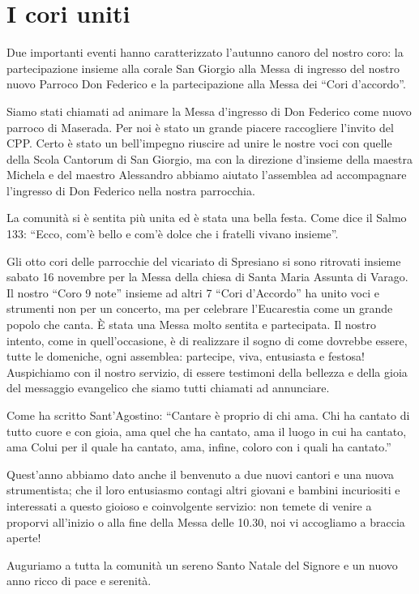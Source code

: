 \section{I cori uniti}

Due importanti eventi hanno caratterizzato l'autunno canoro del nostro coro: la partecipazione insieme alla corale San Giorgio alla Messa di ingresso del nostro nuovo Parroco Don Federico e la partecipazione alla Messa dei ``Cori d'accordo''.

Siamo stati chiamati ad animare la Messa d'ingresso di Don Federico come nuovo parroco di Maserada. Per noi è stato un grande piacere raccogliere l'invito del CPP. Certo è stato un bell'impegno riuscire ad unire le nostre voci con quelle della Scola Cantorum di San Giorgio, ma con la direzione d'insieme della maestra Michela e del maestro Alessandro abbiamo aiutato l'assemblea ad accompagnare l'ingresso di Don Federico nella nostra parrocchia.

La comunità si è sentita più unita ed è stata una bella festa. Come dice il Salmo 133: ``Ecco, com'è bello e com'è dolce che i fratelli vivano insieme''. 


Gli otto cori delle parrocchie del vicariato di Spresiano si sono ritrovati insieme sabato 16 novembre per la Messa della chiesa di Santa Maria Assunta di Varago. Il nostro ``Coro 9 note'' insieme ad altri 7 ``Cori d'Accordo'' ha unito voci e strumenti non per un concerto, ma per celebrare l'Eucarestia come un grande popolo che canta.
È stata una Messa molto sentita e partecipata. Il nostro intento, come in quell'occasione, è di realizzare il sogno di come dovrebbe essere, tutte le domeniche, ogni assemblea: partecipe, viva, entusiasta e festosa! Auspichiamo con il nostro servizio, di essere testimoni della bellezza e della gioia del messaggio evangelico che siamo tutti chiamati ad annunciare.

Come ha scritto Sant'Agostino:
``Cantare è proprio di chi ama. Chi ha cantato di tutto cuore e con gioia, ama quel che ha cantato, ama il luogo in cui ha cantato, ama Colui per il quale ha cantato, ama, infine, coloro con i quali ha cantato.''

Quest'anno abbiamo dato anche il benvenuto a due nuovi cantori e una nuova strumentista; che il loro entusiasmo contagi altri giovani e bambini incuriositi e interessati a questo gioioso e coinvolgente servizio: non temete di venire a proporvi all'inizio o alla fine della Messa delle 10.30, noi vi accogliamo a braccia aperte!

Auguriamo a tutta la comunità un sereno Santo Natale del Signore e un nuovo anno ricco di pace e serenità.



\vfill


